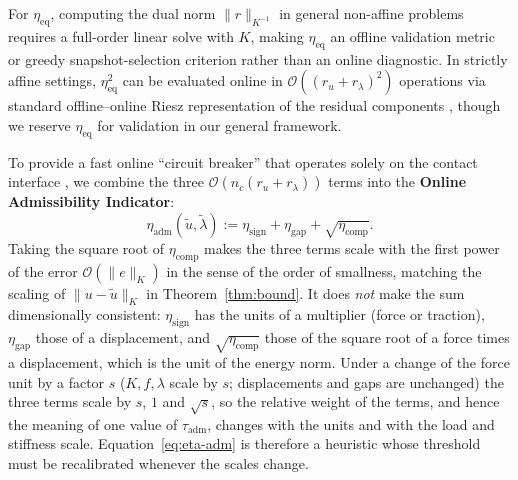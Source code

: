 \documentclass[11pt,a4paper]{article}
\begin{document}
For \(\eta_{\mathrm{eq}}\), computing the dual norm \(\|r\|_{K^{-1}}\) in general non-affine problems requires a full-order linear solve with \(K\), making \(\eta_{\mathrm{eq}}\) an offline validation metric or greedy snapshot-selection criterion rather than an online diagnostic. In strictly affine settings, \(\eta_{\mathrm{eq}}^2\) can be evaluated online in \(\mathcal{O}((r_u + r_\lambda)^2)\) operations via standard offline--online Riesz representation of the residual components \cite{zhang2014duality, benaceur2020reduced}, though we reserve \(\eta_{\mathrm{eq}}\) for validation in our general framework.

To provide a fast online ``circuit breaker'' that operates solely on the contact interface \cite{dabaghi2020posteriori, fauque2018hybrid}, we combine the three \(\mathcal{O}(n_c (r_u + r_\lambda))\) terms into the \textbf{Online Admissibility Indicator}:
\begin{equation}\label{eq:eta-adm}
\eta_{\mathrm{adm}}(\tilde{u}, \tilde{\lambda}) := \eta_{\mathrm{sign}} + \eta_{\mathrm{gap}} + \sqrt{\eta_{\mathrm{comp}}}.
\end{equation}
Taking the square root of \(\eta_{\mathrm{comp}}\) makes the three terms scale with the first power of the error \(\mathcal{O}(\|e\|_K)\) in the sense of the order of smallness, matching the scaling of \(\|u - \tilde{u}\|_K\) in Theorem~\ref{thm:bound}. It does \emph{not} make the sum dimensionally consistent: \(\eta_{\mathrm{sign}}\) has the units of a multiplier (force or traction), \(\eta_{\mathrm{gap}}\) those of a displacement, and \(\sqrt{\eta_{\mathrm{comp}}}\) those of the square root of a force times a displacement, which is the unit of the energy norm. Under a change of the force unit by a factor \(s\) (\(K, f, \lambda\) scale by \(s\); displacements and gaps are unchanged) the three terms scale by \(s\), \(1\) and \(\sqrt{s}\), so the relative weight of the terms, and hence the meaning of one value of \(\tau_{\mathrm{adm}}\), changes with the units and with the load and stiffness scale. Equation~\eqref{eq:eta-adm} is therefore a heuristic whose threshold must be recalibrated whenever the scales change.
\end{document}
